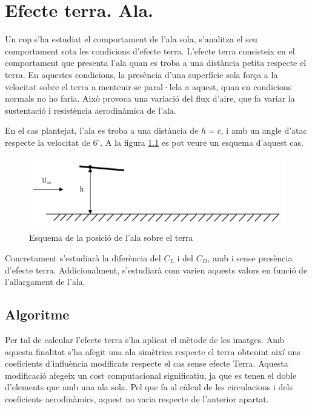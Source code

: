 \chapter{Efecte terra. Ala.}
Un cop s'ha estudiat el comportament de l'ala sola, s'analitza el seu comportament sota les condicions d'efecte terra. L'efecte terra consisteix en el comportament que presenta l'ala quan es troba a una distància petita respecte el terra. En aquestes condicions, la presència d'una superfície sola força a la velocitat sobre el terra a mentenir-se paral·lela a aquest, quan en condicions normals no ho faria. Això provoca una variació del flux d'aire, que fa variar la sustentació i resistència aerodinàmica de l'ala.

En el cas plantejat, l'ala es troba a una distància de $h=\bar{c}$, i amb un angle d'atac respecte la velocitat de 6$^{\circ}$. A la figura \ref{GroundEffect} es pot veure un esquema d'aquest cas.

\begin{figure}[H]
	\centering
	\includegraphics[scale=0.5]{./plots/GroundEffectWing.png}
	\caption{Esquema de la posició de l'ala sobre el terra}
	\label{GroundEffect}
\end{figure}

Concretament s'estudiarà la diferència del $C_{L}$ i del $C_{D}$, amb i sense presència d'efecte terra. Addicionalment, s'estudiarà com varien aquests valors en funció de l'allargament de l'ala.

\section{Algoritme}
\label{gndAlg}
Per tal de calcular l'efecte terra s'ha aplicat el mètode de les imatges. Amb aquesta finalitat s'ha afegit una ala simètrica respecte el terra obtenint així uns coeficients d'influència modificats respecte el cas sense efecte Terra. Aquesta modificació afegeix un cost computacional significatiu, ja que es tenen el doble d'elements que amb una ala sola. Pel que fa al càlcul de les circulacions i dels coeficients aerodinàmics, aquest no varia respecte de l'anterior apartat.


